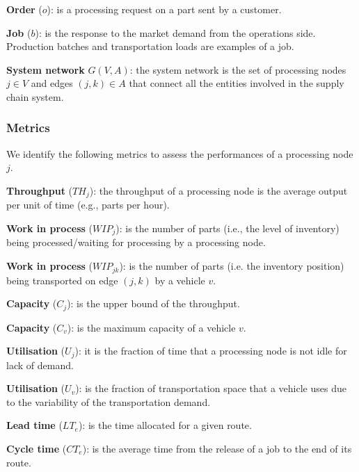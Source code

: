 \textbf{Order} ($o$): is a processing request on a part sent by a customer. \par

\textbf{Job} ($b$): is the response to the market demand from the operations side. Production batches and transportation loads are examples of a job.\par

\textbf{System network} $G(V,A)$: the system network is the set of processing nodes $j\in V$ and edges $\left(j,k\right)\in A$ that connect all the entities involved in the supply chain system.

\subsubsection{Metrics}
We identify the following metrics to assess the performances of a processing node $j$.\par

\textbf{Throughput} ($TH_{j}$): the throughput of a processing node is the average output per unit of time (e.g., parts per hour).\par

\textbf{Work in process} ($WIP_{j}$): is the number of parts (i.e., the level of inventory) being processed/waiting for processing by a processing node.\par

\textbf{Work in process} ($WIP_{jk}$): is the number of parts (i.e. the inventory position) being transported on edge $(j,k)$ by a vehicle $v$. \par

\textbf{Capacity} ($C_j$): is the upper bound of the throughput.\par

\textbf{Capacity} ($C_v$): is the maximum capacity of a vehicle $v$. \par

\textbf{Utilisation} ($U_j$): it is the fraction of time that a processing node is not idle for lack of demand. \par

\textbf{Utilisation} ($U_v$): is the fraction of transportation space that a vehicle uses due to the variability of the transportation demand. \par

\textbf{Lead time} ($LT_e$): is the time allocated for a given route. \par

\textbf{Cycle time} ($CT_e$): is the average time from the release of a job to the end of its route. \par


